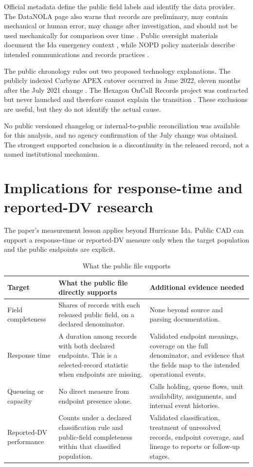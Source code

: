 \documentclass[11pt]{article}
\begin{document}
Official metadata define the public field labels and identify the data provider. The DataNOLA page also warns that records are preliminary, may contain mechanical or human error, may change after investigation, and should not be used mechanically for comparison over time \citep{DataNOLA2021}. Public oversight materials document the Ida emergency context \citep{OIPM2021}, while NOPD policy materials describe intended communications and records practices \citep{NOPDPolicies2023}.

The public chronology rules out two proposed technology explanations. The publicly indexed Carbyne APEX cutover occurred in June 2022, eleven months after the July 2021 change \citep{OPCDCarbyne2022}. The Hexagon OnCall Records project was contracted but never launched and therefore cannot explain the transition \citep{NOLAOIGHexagon2024}. These exclusions are useful, but they do not identify the actual cause.

No public versioned changelog or internal-to-public reconciliation was available for this analysis, and no agency confirmation of the July change was obtained. The strongest supported conclusion is a discontinuity in the released record, not a named institutional mechanism.

\section{Implications for response-time and reported-DV research}

The paper's measurement lesson applies beyond Hurricane Ida. Public CAD can support a response-time or reported-DV measure only when the target population and the public endpoints are explicit.

\begin{table}[!htbp]
\centering
\caption{What the public file supports}
\label{tab:implications}
\begin{tabularx}{\textwidth}{@{}p{}p{}X@{}}
\toprule
Target & What the public file directly supports & Additional evidence needed \\
\midrule
Field completeness &
Shares of records with each released public field, on a declared denominator. &
None beyond source and parsing documentation. \\
Response time &
A duration among records with both declared endpoints. This is a selected-record statistic when endpoints are missing. &
Validated endpoint meanings, coverage on the full denominator, and evidence that the fields map to the intended operational events. \\
Queueing or capacity &
No direct measure from endpoint presence alone. &
Calls holding, queue flows, unit availability, assignments, and internal event histories. \\
Reported-DV performance &
Counts under a declared classification rule and public-field completeness within that classified population. &
Validated classification, treatment of unresolved records, endpoint coverage, and lineage to reports or follow-up stages. \\
\bottomrule
\end{tabularx}
\end{table}
\end{document}
